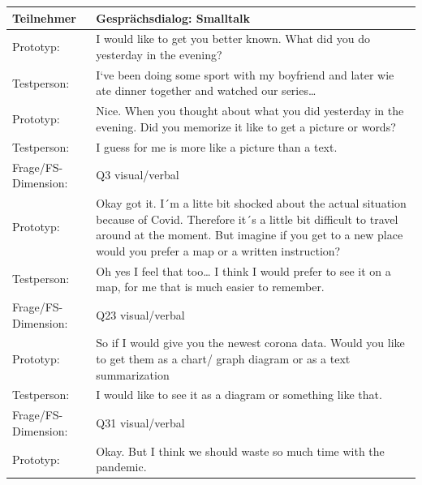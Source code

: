 \begingroup
  \footnotesize 
\begin{longtable}{|m{2.5cm}|m{12.0cm}|}
  \hline     
  \rowcolor[HTML]{EFEFEF}                                         
  \textbf{Teilnehmer} & \textbf{Gesprächsdialog: Smalltalk } \\ 
  \hline \hline  
  
  Prototyp: & I would like to get you better known. What did you do yesterday in the evening?  \\  \hline  
  Testperson: & I‘ve been doing some sport with my boyfriend and later wie ate dinner together and watched our  series…\\ \hline
  \hline 

  Prototyp: & Nice. When you thought about what you did yesterday in the evening. Did you memorize it like to get a picture or words? \\  \hline  
  Testperson: & I guess for me is more like a picture than a text.\\ \hline
   

  Frage/FS-Dimension: & Q3 visual/verbal \\ \hline
  \hline 

  Prototyp: & Okay got it. I´m a litte bit shocked about the actual situation because of Covid. Therefore 
               it´s a little bit difficult to travel around at the moment. But imagine if you get to a new place 
          would you prefer a map or a written instruction?\\  \hline  
  Testperson: & Oh yes I feel that too… I think I would prefer to see it on a map, for me that is much easier to remember. \\ \hline
   

  Frage/FS-Dimension: & Q23 visual/verbal \\ \hline
  \hline 

  Prototyp: & So if I would give you the newest corona data. 
         Would you like to get them as a chart/ graph diagram
         or as a text summarization\\  \hline  
  Testperson: & I would like to see it as a diagram or something like that. \\ \hline
   

  Frage/FS-Dimension: & Q31 visual/verbal \\ \hline
  \hline 

  Prototyp: & Okay. But I think we should waste so much time with the pandemic. \\ \hline
\end{longtable}
\endgroup  


